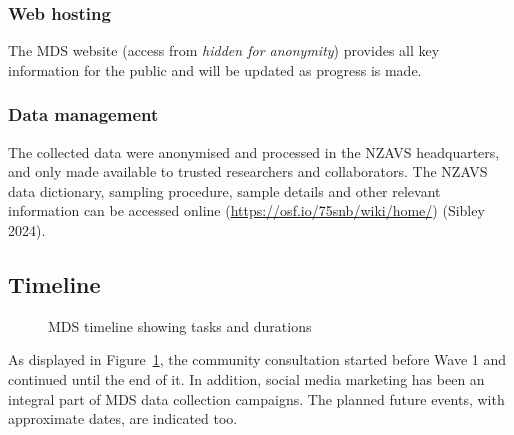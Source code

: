 \documentclass[
]{interact}
\begin{document}
\subsubsection{Web hosting}\label{web-hosting}

The MDS website (access from \emph{hidden for anonymity}) provides all
key information for the public and will be updated as progress is made.

\subsubsection{Data management}\label{data-management}

The collected data were anonymised and processed in the NZAVS
headquarters, and only made available to trusted researchers and
collaborators. The NZAVS data dictionary, sampling procedure, sample
details and other relevant information can be accessed online
(\url{https://osf.io/75snb/wiki/home/}) (Sibley 2024).

\subsection{Timeline}\label{timeline}

\begin{figure}


\caption{\label{fig-timeline}MDS timeline showing tasks and durations}

\end{figure}%

As displayed in Figure~\ref{fig-timeline}, the community consultation
started before Wave 1 and continued until the end of it. In addition,
social media marketing has been an integral part of MDS data collection
campaigns. The planned future events, with approximate dates, are
indicated too.
\end{document}
